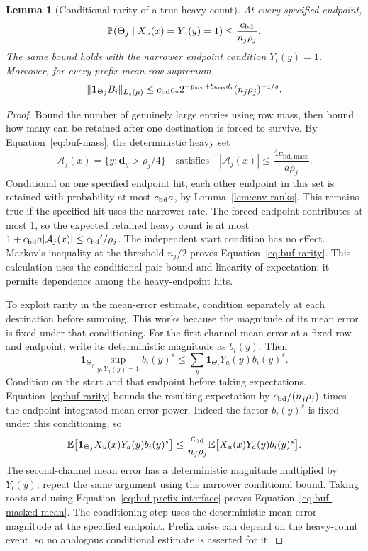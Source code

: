 \documentclass[11pt]{article}
\numberwithin{equation}{section}
\newtheorem{lemma}[theorem]{Lemma}
\theoremstyle{definition}
\theoremstyle{remark}
\begin{document}
\begin{lemma}[Conditional rarity of a true heavy count]
\label{lem:buf-rarity}
At every specified endpoint,
\begin{equation}
 \mathbb P(\Theta_j\mid X_u(x)=Y_a(y)=1)
      \leq\frac{{c_{\rm bd}}}{n_j\rho_j}.
 \label{eq:buf-rarity}
\end{equation}
The same bound holds with the narrower endpoint condition $Y_t(y)=1$.
Moreover, for every prefix mean row supremum,
\begin{equation}
 \|\mathbf1_{\Theta_j}{B_i}\|_{L_s(\mu)}
      \leq {c_{\rm bd}}c_*2^{-{p_{\rm acc}}+{b_{\rm bias}}d_i}(n_j\rho_j)^{-1/s}.
 \label{eq:buf-masked-mean}
\end{equation}
\end{lemma}
\begin{proof}
Bound the number of genuinely large entries using row mass, then bound how many can be retained after one destination is forced to survive. By Equation~\eqref{eq:buf-mass}, the deterministic heavy set
\[
 {\mathcal{A}}_j(x)=\{y:{\mathbf{d}}_y>\rho_j/4\}
 \quad\text{satisfies}\quad
 |{\mathcal{A}}_j(x)|\leq\frac{4{c_{\mathrm{bd},\mathrm{mass}}}}{a\rho_j}.
\]
Conditional on one specified endpoint
hit, each other endpoint in this set is retained with probability at most
${c_{\rm bd}}a$, by Lemma~\ref{lem:env-ranks}.  This remains true if the
specified hit uses the narrower rate.  The forced endpoint contributes
at most 1, so the expected retained heavy count is at most
$1+{c_{\rm bd}}a|{\mathcal{A}}_j(x)|\leq {c_{\rm bd}}'/\rho_j$.
The independent start condition has no effect.  Markov's inequality
at the threshold $n_j/2$ proves Equation~\eqref{eq:buf-rarity}.
This calculation uses the conditional pair bound and linearity of
expectation; it permits dependence among the heavy-endpoint hits.

To exploit rarity in the mean-error estimate, condition separately at each destination before summing. This works because the magnitude of its mean error is fixed under that conditioning. For the first-channel mean error at a fixed row and endpoint, write its
deterministic magnitude as $b_i(y)$.  Then
\[
 \mathbf1_{\Theta_j}\sup_{y:Y_a(y)=1}b_i(y)^s
       \leq\sum_y\mathbf1_{\Theta_j}Y_a(y)b_i(y)^s.
\]
Condition on the start and that endpoint before taking expectations.
Equation~\eqref{eq:buf-rarity} bounds the resulting expectation by
${c_{\rm bd}}/(n_j\rho_j)$ times the endpoint-integrated mean-error power.
Indeed the factor $b_i(y)^s$ is fixed under this conditioning, so
\[
 \mathbb E\bigl[\mathbf1_{\Theta_j}X_u(x)Y_a(y)b_i(y)^s\bigr]
 \leq\frac{{c_{\rm bd}}}{n_j\rho_j}
       \mathbb E\bigl[X_u(x)Y_a(y)b_i(y)^s\bigr].
\]
The second-channel mean error has a deterministic magnitude multiplied
by $Y_t(y)$; repeat the same argument using the narrower conditional
bound.  Taking roots and using Equation~\eqref{eq:buf-prefix-interface}
proves Equation~\eqref{eq:buf-masked-mean}.  The conditioning step uses
the deterministic mean-error magnitude at the specified endpoint.
Prefix noise can depend on the heavy-count event, so no analogous
conditional estimate is asserted for it.
\end{proof}
\end{document}
